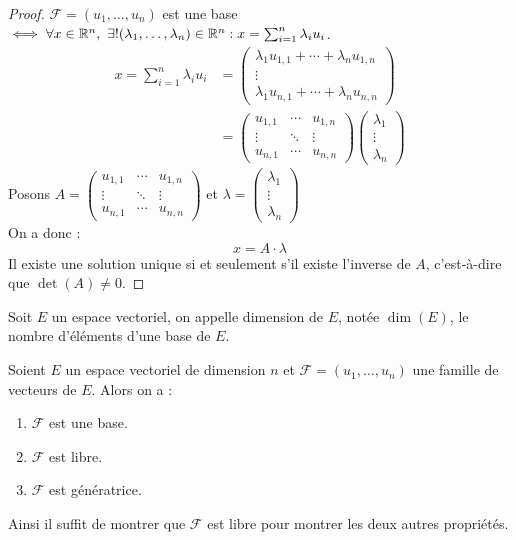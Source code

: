 \begin{proof}
	$\mathcal{F} = (u_1, \ldots, u_n)$ est une base $\iff \forall x \in \R^n,\ \exists ! (\lambda_1, \ldots, \lambda_n) \in \R^n : x = \sum_{i=1}^{n} \lambda_i u_i$.
	\begin{align*}
		x = \sum_{i=1}^{n} \lambda_i u_i &= 
		\begin{pmatrix}
			\lambda_1 u_{1,1} + \cdots + \lambda_n u_{1,n} \\
			\vdots \\
			\lambda_1 u_{n,1} + \cdots + \lambda_n u_{n,n}
		\end{pmatrix}
		\\
		&= 
		\begin{pmatrix}
			u_{1,1} & \cdots & u_{1,n} \\
			\vdots & \ddots & \vdots \\
			u_{n,1} & \cdots & u_{n,n}
		\end{pmatrix}
		\begin{pmatrix}
			\lambda_1 \\
			\vdots \\
			\lambda_n
		\end{pmatrix}
	\end{align*}
	Posons 
	$
	A =
	\begin{pmatrix}
		u_{1,1} & \cdots & u_{1,n} \\
		\vdots & \ddots & \vdots \\
		u_{n,1} & \cdots & u_{n,n}
	\end{pmatrix}
	$
	et 
	$\lambda =
	\begin{pmatrix}
		\lambda_1 \\
		\vdots \\
		\lambda_n
	\end{pmatrix}
	$\\
	On a donc :
	\[ x = A \cdot \lambda \]
	Il existe une solution unique si et seulement s'il existe l'inverse de $A$, c'est-à-dire que $\det(A) \neq 0$.
\end{proof}

\begin{definition}
	Soit $E$ un espace vectoriel, on appelle dimension de $E$, notée $\dim(E)$, le nombre d'éléments d'une base de $E$. 
\end{definition}

\begin{proposition}
	Soient $E$ un espace vectoriel de dimension $n$ et $\mathcal{F} = (u_1, \ldots, u_n)$ une famille de vecteurs de $E$. Alors on a :
	\begin{enumerate}
		\item $\mathcal{F}$ est une base.
		\item $\mathcal{F}$ est libre.
		\item $\mathcal{F}$ est génératrice.
	\end{enumerate}
	\noindent Ainsi il suffit de montrer que $\mathcal{F}$ est libre pour montrer les deux autres propriétés.
\end{proposition}

